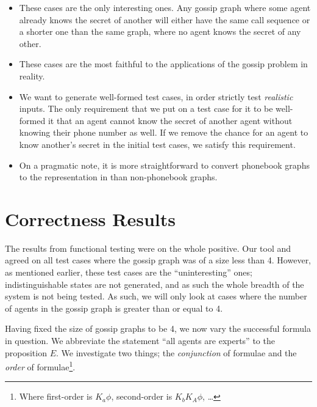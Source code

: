\documentclass[10pt, a4paper]{report}
\begin{document}
\begin{itemize}
\item These cases are the only interesting ones. Any gossip graph where some
  agent already knows the secret of another will either have the same call
  sequence or a shorter one than the same graph, where no agent knows the secret
  of any other.
\item These cases are the most faithful to the applications of the gossip
  problem in reality.
\item We want to generate well-formed test cases, in order strictly test
  \emph{realistic} inputs. The only requirement that we put on a test case for
  it to be well-formed it that an agent cannot know the secret of another agent
  without knowing their phone number as well. If we remove the chance for an
  agent to know another's secret in the initial test cases, we satisfy this
  requirement. 
\item On a pragmatic note, it is more straightforward to convert phonebook
  graphs to the representation in \cite{GithubGossip} than non-phonebook graphs.
\end{itemize}

\section{Correctness Results}

The results from functional testing were on the whole positive. Our tool and
\cite{GithubGossip} agreed on all test cases where the gossip graph was of a
size less than 4. However, as mentioned earlier, these test cases are the
``uninteresting'' ones; indistinguishable states are not generated, and as such
the whole breadth of the system is not being tested. As such, we will only look
at cases where the number of agents in the gossip graph is greater than or equal
to 4. 

Having fixed the size of gossip graphs to be 4, we now vary the successful
formula in question. We abbreviate the statement ``all agents are experts'' to
the proposition $E$. We investigate two things; the \emph{conjunction} of
formulae and the \emph{order} of formulae\footnote{Where first-order is $K_a
  \phi$, second-order is $K_b K_A \phi$, \ldots}. 


\end{document}
